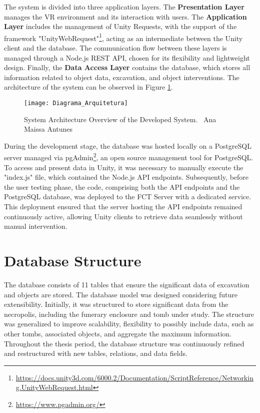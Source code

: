 The system is divided into three application layers.
The \textbf{Presentation Layer} manages the \gls{VR} environment and its interaction with users. The \textbf{Application Layer} includes the management of Unity Requests, with the support of the framework "UnityWebRequest"\footnote{\url{https://docs.unity3d.com/6000.2/Documentation/ScriptReference/Networking.UnityWebRequest.html}}, acting as an intermediate between the Unity client and the database. 
The communication flow between these layers is managed through a Node.js \gls{REST} \gls{API}, chosen for its flexibility and lightweight design. 
Finally, the \textbf{Data Access Layer} contains the database, which stores all information related to object data, excavation, and object interventions. 
The architecture of the system can be observed in Figure \ref{fig:architecture}.
\begin{figure}[h!]
    \centering
    \texttt{[image: Diagrama\_Arquitetura]}
    \caption{System Architecture Overview of the Developed System. \textcopyright\ Ana Maissa Antunes}
    \label{fig:architecture}
\end{figure}

During the development stage, the database was hosted locally on a PostgreSQL server managed via pgAdmin\footnote{\url{https://www.pgadmin.org/}}, an open source management tool for PostgreSQL. To access and present data in Unity, it was necessary to manually execute the "index.js" file, which contained the Node.js API endpoints.
Subsequently, before the user testing phase, the code, comprising both the \gls{API} endpoints and the PostgreSQL database, was deployed to the \gls{FCT} Server with a dedicated service.
This deployment ensured that the server hosting the \gls{API} endpoints remained continuously active, allowing Unity clients to retrieve data seamlessly without manual intervention.


\section{Database Structure}
\label{sec:database}

The database consists of 11 tables that ensure the significant data of excavation and objects are stored. %
The database model was designed considering future extensibility. Initially, it was structured to store significant data from the necropolis, including the funerary enclosure and tomb under study. The structure was generalized to improve scalability, flexibility to possibly include data, such as other tombs, associated objects, and aggregate the maximum information. 
Throughout the thesis period, the database structure was continuously refined and restructured with new tables, relations, and data fields.

